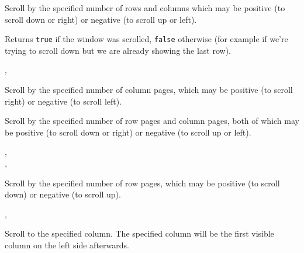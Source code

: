 Scroll by the specified number of rows and columns which may be positive (to
scroll down or right) or negative (to scroll up or left).

Returns {\tt true} if the window was scrolled, {\tt false} otherwise (for
example if we're trying to scroll down but we are already showing the last
row).


, 


\label{wxhvscrolledwindowscrollcolumnpages}


Scroll by the specified number of column pages, which may be positive (to
scroll right) or negative (to scroll left).


\label{wxhvscrolledwindowscrollpages}


Scroll by the specified number of row pages and column pages, both of which may
be positive (to scroll down or right) or negative (to scroll up or left).


,\\
, 


\label{wxhvscrolledwindowscrollrowpages}


Scroll by the specified number of row pages, which may be positive (to scroll
down) or negative (to scroll up).


, 


\label{wxhvscrolledwindowscrolltocolumn}


Scroll to the specified column. The specified column will be the first visible
column on the left side afterwards.

